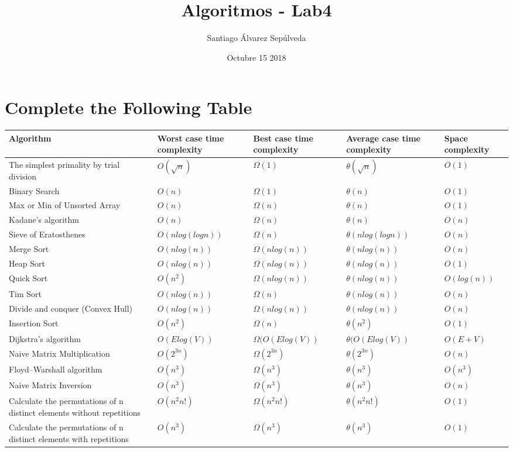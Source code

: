 \documentclass{article}
\title{Algoritmos - Lab4}
\author{Santiago Álvarez Sepúlveda }
\date{Octubre 15 2018}
\begin{document}
\maketitle

\section{Complete the Following Table}

\begin{longtable}[H]{|p{2.5cm}|p{2cm}|p{2cm}|p{2cm}|p{2cm}|}
\hline
\textbf{Algorithm} & \textbf{Worst case time complexity} & \textbf{Best case time complexity} & \textbf{Average case time complexity} & \textbf{Space complexity} \\ \hline
The simplest primality by trial division & $O(\sqrt{n})$ & $\Omega(1)$ & $\theta(\sqrt{n})$ & $O(1)$ \\ \hline
Binary Search & $O(n)$ & $\Omega(1)$ & $\theta(n)$ & $O(1)$ \\ \hline
Max or Min of Unsorted Array & $O(n)$ & $\Omega(n)$ & $\theta(n)$ & $O(1)$ \\ \hline
Kadane's algorithm & $O(n)$ & $\Omega(n)$ & $\theta(n)$ & $O(n)$ \\ \hline
Sieve of Eratosthenes  & $O(nlog(logn))$ & $\Omega(n)$ & $\theta(nlog(logn))$ & $O(n)$ \\ \hline
Merge Sort & $O(nlog(n))$ & $\Omega(nlog(n))$ & $\theta(nlog(n))$ & $O(n)$ \\ \hline
Heap Sort & $O(nlog(n))$ & $\Omega(nlog(n))$ & $\theta(nlog(n))$ & $O(1)$ \\ \hline
Quick Sort  & $O(n^2)$ & $\Omega(nlog(n))$ & $\theta(nlog(n))$ & $O(log(n))$ \\ \hline
Tim Sort & $O(nlog(n))$ & $\Omega(n)$ & $\theta(nlog(n))$ & $O(n)$ \\ \hline
Divide and conquer (Convex Hull) & $O(nlog(n))$ & $\Omega(nlog(n))$ & $\theta(nlog(n))$ & $O(n)$ \\ \hline
Insertion Sort & $O(n^2)$ & $\Omega(n)$ & $\theta(n^2)$ & $O(1)$ \\ \hline
Dijkstra's algorithm & $O(E log(V))$ & $\Omega(O(E log(V))$ & $\theta(O(E log(V))$ & $O(E+V)$ \\ \hline
Naive Matrix Multiplication & $O(2^{3n})$ & $\Omega(2^{3n})$ & $\theta(2^{3n})$ & $O(n)$ \\ \hline
Floyd–Warshall algorithm & $O(n^3)$ & $\Omega(n^3)$ & $\theta(n^3)$ & $O(n^3)$ \\ \hline
Naive Matrix Inversion & $O(n^3)$ & $\Omega(n^3)$ & $\theta(n^3)$ & $O(n)$ \\ \hline
Calculate the permutations of n distinct elements without repetitions & $O(n^2 n!)$ & $\Omega(n^2 n!)$ & $\theta(n^2 n!)$ & $O(1)$ \\ \hline
Calculate the permutations of n distinct elements with repetitions & $O(n^3)$ & $\Omega(n^3)$ & $\theta(n^3)$ & $O(1)$ \\ \hline
\end{longtable}
\end{document}
